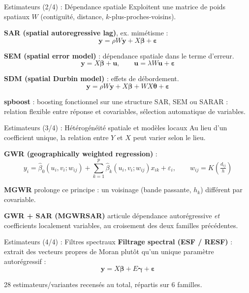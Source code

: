 \documentclass[aspectratio=169,11pt]{beamer}
\begin{document}
\begin{frame}{Estimateurs (2/4) : Dépendance spatiale}
\small
Exploitent une matrice de poids spatiaux $W$ (contiguïté, distance,
$k$-plus-proches-voisins).
\vspace{0.2cm}

\textbf{SAR (spatial autoregressive lag)}, ex. mimétisme :
\[
\mathbf{y}=\rho W\mathbf{y}+X\boldsymbol{\beta}+\boldsymbol{\varepsilon}
\]
\vspace{0.1cm}

\textbf{SEM (spatial error model)} : dépendance spatiale dans le terme d'erreur.
\[
\mathbf{y}=X\boldsymbol{\beta}+\mathbf{u},\qquad \mathbf{u}=\lambda W\mathbf{u}+\boldsymbol{\varepsilon}
\]
\vspace{0.1cm}

\textbf{SDM (spatial Durbin model)} : effets de débordement.
\[
\mathbf{y}=\rho W\mathbf{y}+X\boldsymbol{\beta}+WX\boldsymbol{\theta}+\boldsymbol{\varepsilon}
\]
\vspace{0.1cm}

\textbf{spboost} : boosting fonctionnel sur une structure SAR, SEM ou
SARAR : relation flexible entre réponse et covariables, sélection
automatique de variables.
\end{frame}

\begin{frame}{Estimateurs (3/4) : Hétérogénéité spatiale et modèles locaux}
\small
Au lieu d'un coefficient unique, la relation entre $Y$ et $X$ peut varier
selon le lieu.
\vspace{0.2cm}

\textbf{GWR (geographically weighted regression)} :
\[
y_i=\hat{\beta}_0(u_i,v_i;w_{ij})+\sum_{k=1}^{p}\hat{\beta}_k(u_i,v_i;w_{ij})x_{ik}+\varepsilon_i,
\qquad w_{ij}=K\!\left(\tfrac{d_{ij}}{h}\right)
\]
\vspace{0.2cm}

\textbf{MGWR} prolonge ce principe : un voisinage (bande passante, $h_k$)
différent par covariable.
\vspace{0.2cm}

\textbf{GWR + SAR (MGWRSAR)} articule dépendance autorégressive \emph{et}
coefficients localement variables, au croisement des deux familles
précédentes.
\end{frame}

\begin{frame}{Estimateurs (4/4) : Filtres spectraux}
\small
\textbf{Filtrage spectral (ESF / RESF)} : extrait des vecteurs propres de
Moran plutôt qu'un unique paramètre autorégressif :
\[
\mathbf{y}=X\boldsymbol{\beta}+E\boldsymbol{\gamma}+\boldsymbol{\varepsilon}
\]
\vspace{0.2cm}

{\scriptsize\textcolor{mygray}{28 estimateurs/variantes recensés au total, répartis sur 6 familles.}}
\end{frame}
\end{document}

